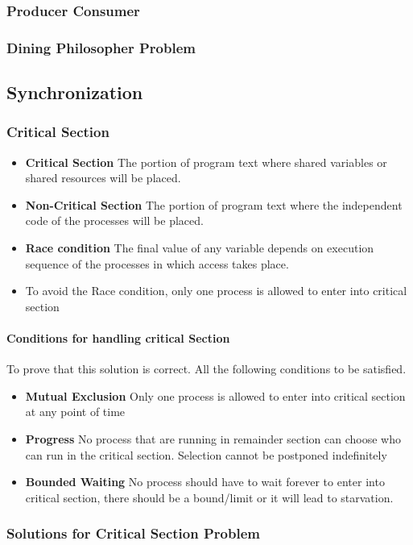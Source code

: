 \subsubsection{Producer Consumer} %
\subsubsection{Dining Philosopher Problem} %
\subsection{Synchronization}
\subsubsection{Critical Section}
\begin{itemize}
	\item \textbf{Critical Section} The portion of program text where shared variables or shared resources will be placed.
	\item \textbf{Non-Critical Section} The portion of program text where the independent code of the processes will be placed.
	\item \textbf{Race condition} The final value of any variable depends on execution sequence of the processes in which access takes place.
	\item To avoid the Race condition, only one process is allowed to enter into critical section
\end{itemize}
\paragraph{Conditions for handling critical Section}
To prove that this solution is correct. All the following conditions to be satisfied. 
\begin{itemize}
	\item \textbf{Mutual Exclusion} Only one process is allowed to enter into critical section at any point of time
	\item \textbf{Progress} No process that are running in remainder section can choose who can run in the critical section. Selection cannot be postponed indefinitely
	\item \textbf{Bounded Waiting} No process should have to wait forever to enter into critical section, there should be a bound/limit or it will lead to starvation.
\end{itemize}
\subsubsection{Solutions for Critical Section Problem}
